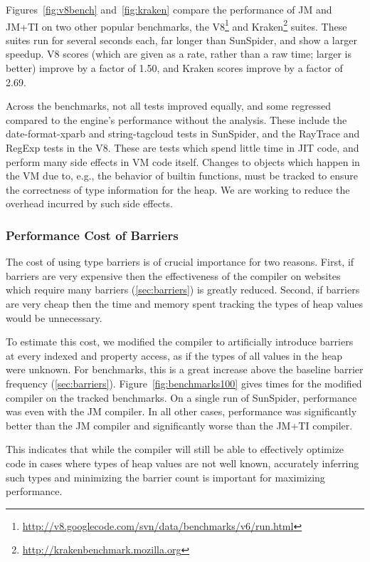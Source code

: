 Figures~\ref{fig:v8bench} and~\ref{fig:kraken} compare the performance of JM and JM+TI
on two other popular benchmarks, the V8\footnote{\url{http://v8.googlecode.com/svn/data/benchmarks/v6/run.html}}
and Kraken\footnote{\url{http://krakenbenchmark.mozilla.org}} suites.
These suites run for several seconds each, far longer than SunSpider,
and show a larger speedup.
V8 scores (which are given as a rate, rather than a raw time; larger is better) improve by a factor of 1.50,
and Kraken scores improve by a factor of 2.69.

Across the benchmarks, not all tests improved equally, and some regressed compared to
the engine's performance without the analysis.
These include the date-format-xparb and string-tagcloud tests in SunSpider,
and the RayTrace and RegExp tests in the V8.
These are tests which spend little time in JIT code, and perform many side
effects in VM code itself.
Changes to objects which happen in the VM due to, e.g., the behavior of
builtin functions, must be tracked to ensure the correctness of type
information for the heap.
We are working to reduce the overhead incurred by such side effects.

\subsubsection{Performance Cost of Barriers}
\label{sec:barrier_cost}

The cost of using type barriers is of crucial importance for two reasons.
First, if barriers are very expensive then the effectiveness of the compiler
on websites which require many barriers (\Section\ref{sec:barriers})
is greatly reduced.
Second, if barriers are very cheap then the time and memory spent
tracking the types of heap values would be unnecessary.

To estimate this cost, we modified the compiler to artificially introduce
barriers at every indexed and property access, as if the types of all values
in the heap were unknown.
For benchmarks, this is a great increase above the baseline barrier
frequency (\Section\ref{sec:barriers}).
Figure~\ref{fig:benchmarks100} gives times for the modified compiler on the
tracked benchmarks.
On a single run of SunSpider, performance was even with the JM
compiler.
In all other cases, performance was significantly better than the JM
compiler and significantly worse than the JM+TI compiler.

This indicates that while the compiler will still be able to effectively
optimize code in cases where types of heap values are not well known,
accurately inferring such types and minimizing the barrier count is important
for maximizing performance.

